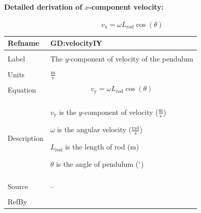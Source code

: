 \documentclass[12pt]{article}
\begin{document}
\paragraph{Detailed derivation of $x$-component velocity:}
\label{GD:velocityIXDeriv}
\begin{displaymath}
{v_{\text{x}}}=ω {L_{\text{rod}}} \cos\left(θ\right)
\end{displaymath}
\vspace{\baselineskip}
\noindent
\begin{minipage}{\textwidth}
\begin{tabular}{>{\raggedright}p{}>{\raggedright\arraybackslash}p{}}
\toprule \textbf{Refname} & \textbf{GD:velocityIY}
\label{GD:velocityIY}
\\ \midrule \\
Label & The $y$-component of velocity of the pendulum
        
\\ \midrule \\
Units & $\frac{\text{m}}{\text{s}}$
        
\\ \midrule \\
Equation & \begin{displaymath}
           {v_{\text{y}}}=ω {L_{\text{rod}}} \cos\left(θ\right)
           \end{displaymath}
\\ \midrule \\
Description & \begin{symbDescription}
              \item{${v_{\text{y}}}$ is the $y$-component of velocity ($\frac{\text{m}}{\text{s}}$)}
              \item{$ω$ is the angular velocity ($\frac{\text{rad}}{\text{s}}$)}
              \item{${L_{\text{rod}}}$ is the length of rod (${\text{m}}$)}
              \item{$θ$ is the angle of pendulum (${{}^{\circ}}$)}
              \end{symbDescription}
\\ \midrule \\
Source & --
         
\\ \midrule \\
RefBy & 
\\ \bottomrule
\end{tabular}
\end{minipage}
\end{document}
